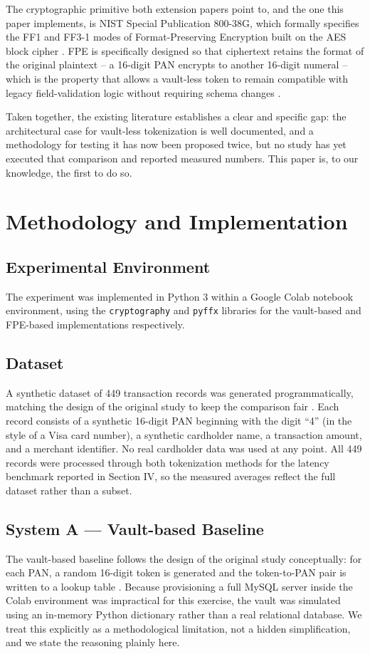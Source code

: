 \documentclass[conference]{IEEEtran}
\begin{document}
The cryptographic primitive both extension papers point to, and the one this paper implements, is NIST Special Publication 800-38G, which formally specifies the FF1 and FF3-1 modes of Format-Preserving Encryption built on the AES block cipher \cite{b4}. FPE is specifically designed so that ciphertext retains the format of the original plaintext -- a 16-digit PAN encrypts to another 16-digit numeral -- which is the property that allows a vault-less token to remain compatible with legacy field-validation logic without requiring schema changes \cite{b4}.

Taken together, the existing literature establishes a clear and specific gap: the architectural case for vault-less tokenization is well documented, and a methodology for testing it has now been proposed twice, but no study has yet executed that comparison and reported measured numbers. This paper is, to our knowledge, the first to do so.

\section{Methodology and Implementation}

\subsection{Experimental Environment}
The experiment was implemented in Python 3 within a Google Colab notebook environment, using the \texttt{cryptography} and \texttt{pyffx} libraries for the vault-based and FPE-based implementations respectively.

\subsection{Dataset}
A synthetic dataset of 449 transaction records was generated programmatically, matching the design of the original study to keep the comparison fair \cite{b1}. Each record consists of a synthetic 16-digit PAN beginning with the digit ``4'' (in the style of a Visa card number), a synthetic cardholder name, a transaction amount, and a merchant identifier. No real cardholder data was used at any point. All 449 records were processed through both tokenization methods for the latency benchmark reported in Section IV, so the measured averages reflect the full dataset rather than a subset.

\subsection{System A --- Vault-based Baseline}
The vault-based baseline follows the design of the original study conceptually: for each PAN, a random 16-digit token is generated and the token-to-PAN pair is written to a lookup table \cite{b1}. Because provisioning a full MySQL server inside the Colab environment was impractical for this exercise, the vault was simulated using an in-memory Python dictionary rather than a real relational database. We treat this explicitly as a methodological limitation, not a hidden simplification, and we state the reasoning plainly here.
\end{document}
